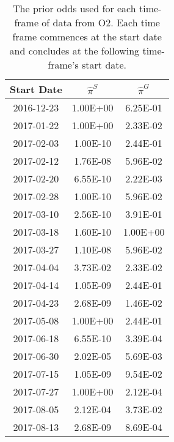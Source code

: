 \begin{table}
\centering
\caption{The prior odds used for each time-frame of data from O2. Each time frame commences at the start date and concludes at the following time-frame's start date.
    }
\label{tab:priorodds}
\def\arraystretch{1.5} 
\setlength{\tabcolsep}{0.5em}
\begin{tabular}{c|cc}

 Start Date &    $\hat{\pi}^S$ &    $\hat{\pi}^G$ \\
\midrule
 2016-12-23 & 1.00E+00 & 6.25E-01 \\
 2017-01-22 & 1.00E+00 & 2.33E-02 \\
 2017-02-03 & 1.00E-10 & 2.44E-01 \\
 2017-02-12 & 1.76E-08 & 5.96E-02 \\
 2017-02-20 & 6.55E-10 & 2.22E-03 \\
 2017-02-28 & 1.00E-10 & 5.96E-02 \\
 2017-03-10 & 2.56E-10 & 3.91E-01 \\
 2017-03-18 & 1.60E-10 & 1.00E+00 \\
 2017-03-27 & 1.10E-08 & 5.96E-02 \\
 2017-04-04 & 3.73E-02 & 2.33E-02 \\
 2017-04-14 & 1.05E-09 & 2.44E-01 \\
 2017-04-23 & 2.68E-09 & 1.46E-02 \\
 2017-05-08 & 1.00E+00 & 2.44E-01 \\
 2017-06-18 & 6.55E-10 & 3.39E-04 \\
 2017-06-30 & 2.02E-05 & 5.69E-03 \\
 2017-07-15 & 1.05E-09 & 9.54E-02 \\
 2017-07-27 & 1.00E+00 & 2.12E-04 \\
 2017-08-05 & 2.12E-04 & 3.73E-02 \\
 2017-08-13 & 2.68E-09 & 8.69E-04 \\

\end{tabular}
\end{table}
